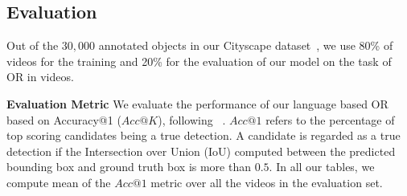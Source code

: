 \documentclass[10pt,twocolumn,letterpaper]{article}
\begin{document}
\subsection{Evaluation}
Out of the $30,000$ annotated objects in our Cityscape dataset~\cite{cityscape}, we use 80\% of videos for the training and 20\% for the evaluation of our model on the task of OR in videos.

\bigskip
\noindent
\textbf{Evaluation Metric}
We evaluate the performance of our language based OR based on Accuracy@1 ($Acc@K$), following ~\cite{hu2016natural,mao2016generation}. 
$Acc@1$ refers to the percentage of top scoring candidates being a true detection. A candidate is regarded as a true detection if the Intersection over Union (IoU) computed between the predicted bounding box and ground truth box is more than $0.5$. 
In all our tables, we compute mean of the $Acc@1$ metric over all the videos in the evaluation set. 
\end{document}
